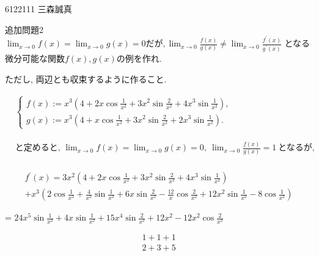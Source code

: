 \documentclass{jsarticle}
\begin{document}
\begin{flushright}
6122111 三森誠真
\end{flushright}

\begin{itembox}[l]{追加問題2}
$\displaystyle\lim _{x \rightarrow 0} f(x)=\lim _{x \rightarrow 0} g(x)=0 だが,  \lim _{x \rightarrow 0} \frac{f(x)}{g(x)} \neq \lim _{x \rightarrow 0} \frac{f^{\prime}(x)}{g^{\prime}(x)}$ となる微分可能な関数$f(x),g(x)$の例を作れ. 

ただし, 両辺とも収束するように作ること.
\end{itembox}

\bigskip

\( \begin{aligned}  & \begin{cases}\displaystyle f(x):=x^3\left(4+2 x \cos \frac{1}{x^2}+3 x^2 \sin \frac{2}{x^2}+4 x^3 \sin \frac{1}{x^2}\right), & \\ 
\displaystyle g(x):=x^3\left(4+x \cos \frac{1}{x^2}+3 x^2 \sin \frac{2}{x^2}+2 x^3 \sin \frac{1}{x^2}\right) .\end{cases} \end{aligned}\)


\(\begin{aligned}& \text{と定めると, }  \displaystyle\lim _{x \rightarrow 0} f(x)=\lim _{x \rightarrow 0} g(x)=0, \ \displaystyle \lim _{x \rightarrow 0} \frac{f(x)}{g(x)}=1 \ \text{となるが,}\\ & \end{aligned} \)

\begin{multline*}
f^{\prime}(x)=3 x^2\left(4+2 x \cos \frac{1}{x^2}+3 x^2 \sin \frac{2}{x^2}+4 x^3 \sin \frac{1}{x^2}\right) \\
+x^3\left(2 \cos \frac{1}{x^2}+\frac{4}{x^2} \sin \frac{1}{x^2}+6 x \sin \frac{2}{x^2}-\frac{12}{x} \cos \frac{2}{x^2}+12 x^2 \sin \frac{1}{x^2}-8 \cos \frac{1}{x^2}\right)
\end{multline*}

\hspace*{3zw} = $\displaystyle 24x^5\sin \frac{1}{x^2}+4x\sin \frac{1}{x^2}+15x^4\sin \frac{2}{x^2}+12x^2-12x^2\cos \frac{2}{x^2}$


\begin{multline*}
1+1+1 \\
2+3+5
\end{multline*}

 
\end{document}
